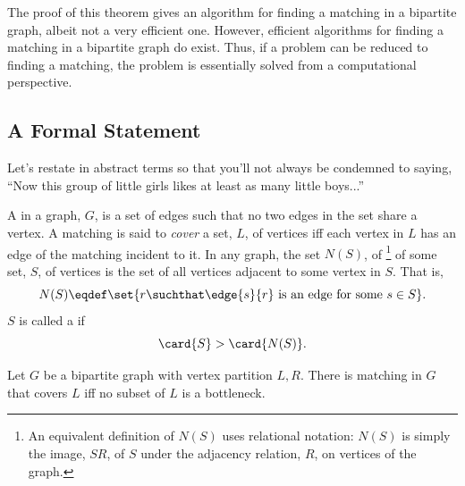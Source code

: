 The proof of this theorem gives an algorithm for finding a matching in
a bipartite graph, albeit not a very efficient one.  However,
efficient algorithms for finding a matching in a bipartite graph do
exist.  Thus, if a problem can be reduced to finding a matching, the
problem is essentially solved from a computational perspective.

\subsection{A Formal Statement}

Let's restate  in abstract terms so that you'll not
always be condemned to saying, ``Now this group of little girls likes
at least as many little boys...''  

%


A  in a graph, $G$, is a set of edges such that no two
edges in the set share a vertex.  A matching is said to \emph{cover} a
set, $L$, of vertices iff each vertex in $L$ has an edge of the matching
incident to it.
In any graph, the set $N(S)$, of \footnote{An equivalent
  definition of $N(S)$ uses relational notation: $N(S)$ is simply the
  image, $SR$, of $S$ under the adjacency relation, $R$, on vertices of
  the graph.} of some set, $S$, of vertices is the set of all vertices
adjacent to some vertex in $S$.  That is,
\[
N(S) \eqdef \set{r \suchthat \edge{s}{r}\text{ is an edge for some }s \in S}.
\]
$S$ is called a  if
\[
\card{S} > \card{N(S)}.
\]

\begin{theorem}
  Let $G$ be a bipartite graph with vertex partition $L,R$.  There is
  matching in $G$ that covers $L$ iff no subset of $L$ is a bottleneck.
\end{theorem}

